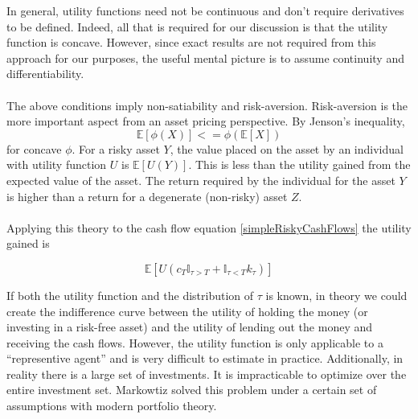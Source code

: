 \documentclass{article}
\theoremstyle{definition}
\begin{document}
In general, utility functions need not be continuous and don't require derivatives to be defined.  Indeed, all that is required for our discussion is that the utility function is concave.  However, since exact results are not required from this approach for our purposes, the useful mental picture is to assume continuity and differentiability.
\\
\\
The above conditions imply non-satiability and risk-aversion.  Risk-aversion is the more important aspect from an asset pricing perspective.  By Jenson's inequality, 
\[\mathbb{E}[\phi(X)]<=\phi(\mathbb{E}[X])\]
for concave \(\phi\).  For a risky asset \(Y\), the value placed on the asset by an individual with utility function \(U\) is \(\mathbb{E}[U(Y)]\).  This is less than the utility gained from the expected value of the asset.  The return required by the individual for the asset \(Y\) is higher than a return for a degenerate (non-risky) asset \(Z\).   
\\
\\
Applying this theory to the cash flow equation \ref{simpleRiskyCashFlows} the utility gained is

\[\mathbb{E}\left[U\left( c_T \mathbb{I}_{\tau>T}+\mathbb{I}_{\tau<T} k_\tau \right) \right]\]

If both the utility function and the distribution of \(\tau\) is known, in theory we could create the indifference curve between the utility of holding the money (or investing in a risk-free asset) and the utility of lending out the money and receiving the cash flows.  However, the utility function is only applicable to a ``representive agent'' and is very difficult to estimate in practice.  Additionally, in reality there is a large set of investments.  It is impracticable to optimize over the entire investment set.  Markowtiz solved this problem under a certain set of assumptions with modern portfolio theory.  
\end{document}
